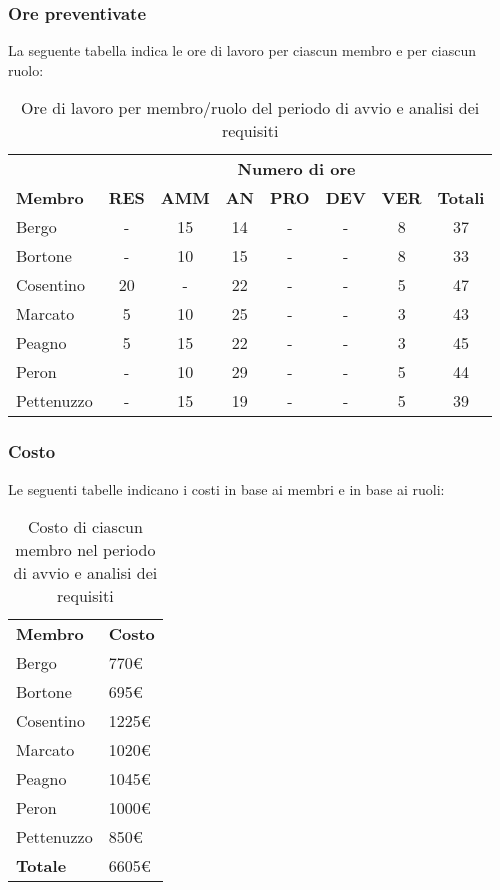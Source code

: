 	\subsubsection{Ore preventivate}
		La seguente tabella indica le ore di lavoro per ciascun membro e per ciascun ruolo:
		\begin{table}[h]
			\centering
			\begin{tabular}{| l | c c c c c c | c |}
				\rowcolor{LightBlue}
				& \multicolumn{7}{c}{\textbf{\color{white}Numero di ore}}	\\
	
				\rowcolor{LightBlue}
				\textbf{\color{white}Membro}
				& \textbf{\color{white}RES}
				& \textbf{\color{white}AMM}
				& \textbf{\color{white}AN}
				& \textbf{\color{white}PRO}
				& \textbf{\color{white}DEV}
				& \textbf{\color{white}VER}
				& \textbf{\color{white}Totali}\\
	
				Bergo 				& - & 15 & 14 & - & - & 8 & 37\\
				Bortone 			& - & 10 & 15	& - & - & 8 & 33\\
				Cosentino 		& 20 & - & 22 & - & - & 5 & 47\\
				Marcato 			& 5 & 10 & 25 & - & - & 3 & 43\\
				Peagno 			& 5 & 15 & 22 & - & - & 3 & 45\\
				Peron 				& - & 10 & 29 & - & - & 5 & 44\\
				Pettenuzzo 	& - & 15 & 19 & - & - & 5 & 39\\ \hline
			\end{tabular}
			\caption{Ore di lavoro per membro/ruolo del periodo di avvio e analisi dei requisiti}
		\end{table}
		
	\subsubsection{Costo}
		Le seguenti tabelle indicano i costi in base ai membri e in base ai ruoli:
		\begin{table}[h]
			\centering		
			\begin{tabular}{| l | l |}
				\rowcolor{LightBlue}
				\textbf{\color{white}Membro}
				& \textbf{\color{white}Costo}\\
			
				Bergo 				& 770€\\
				Bortone 			& 695€\\
				Cosentino 		& 1225€\\
				Marcato 			& 1020€\\
				Peagno 			& 1045€\\
				Peron 				& 1000€\\
				Pettenuzzo 	& 850€\\ \hline
				\textbf{Totale} & 6605€\\ \hline
			\end{tabular}
			\caption{Costo di ciascun membro nel periodo di avvio e analisi dei requisiti}
		\end{table}
		
